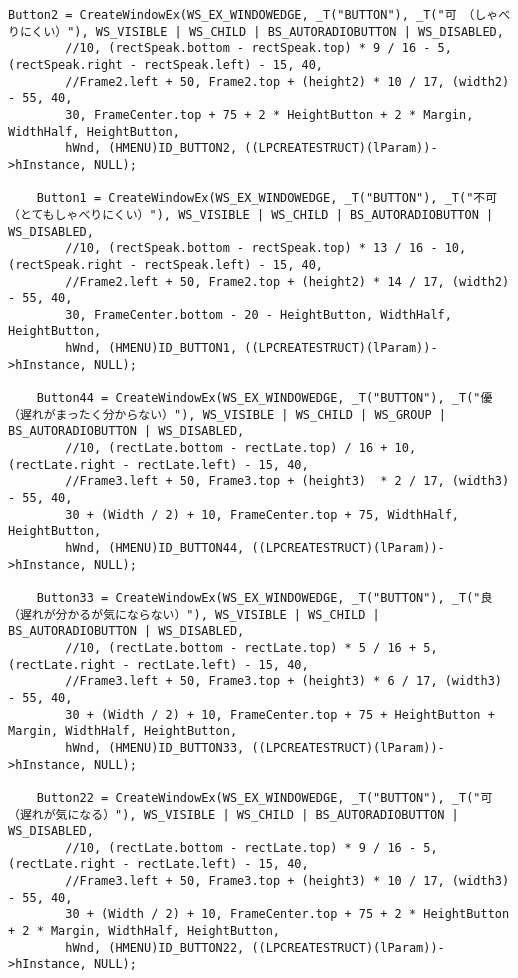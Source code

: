 \begin{lstlisting}[caption=window.cpp]
	Button2 = CreateWindowEx(WS_EX_WINDOWEDGE, _T("BUTTON"), _T("可　（しゃべりにくい）"), WS_VISIBLE | WS_CHILD | BS_AUTORADIOBUTTON | WS_DISABLED,
		//10, (rectSpeak.bottom - rectSpeak.top) * 9 / 16 - 5, (rectSpeak.right - rectSpeak.left) - 15, 40,
		//Frame2.left + 50, Frame2.top + (height2) * 10 / 17, (width2) - 55, 40,
		30, FrameCenter.top + 75 + 2 * HeightButton + 2 * Margin, WidthHalf, HeightButton,
		hWnd, (HMENU)ID_BUTTON2, ((LPCREATESTRUCT)(lParam))->hInstance, NULL);

	Button1 = CreateWindowEx(WS_EX_WINDOWEDGE, _T("BUTTON"), _T("不可（とてもしゃべりにくい）"), WS_VISIBLE | WS_CHILD | BS_AUTORADIOBUTTON | WS_DISABLED,
		//10, (rectSpeak.bottom - rectSpeak.top) * 13 / 16 - 10, (rectSpeak.right - rectSpeak.left) - 15, 40,
		//Frame2.left + 50, Frame2.top + (height2) * 14 / 17, (width2) - 55, 40,
		30, FrameCenter.bottom - 20 - HeightButton, WidthHalf, HeightButton,
		hWnd, (HMENU)ID_BUTTON1, ((LPCREATESTRUCT)(lParam))->hInstance, NULL);

	Button44 = CreateWindowEx(WS_EX_WINDOWEDGE, _T("BUTTON"), _T("優　（遅れがまったく分からない）"), WS_VISIBLE | WS_CHILD | WS_GROUP | BS_AUTORADIOBUTTON | WS_DISABLED,
		//10, (rectLate.bottom - rectLate.top) / 16 + 10, (rectLate.right - rectLate.left) - 15, 40,
		//Frame3.left + 50, Frame3.top + (height3)  * 2 / 17, (width3) - 55, 40,
		30 + (Width / 2) + 10, FrameCenter.top + 75, WidthHalf, HeightButton,
		hWnd, (HMENU)ID_BUTTON44, ((LPCREATESTRUCT)(lParam))->hInstance, NULL);

	Button33 = CreateWindowEx(WS_EX_WINDOWEDGE, _T("BUTTON"), _T("良　（遅れが分かるが気にならない）"), WS_VISIBLE | WS_CHILD | BS_AUTORADIOBUTTON | WS_DISABLED,
		//10, (rectLate.bottom - rectLate.top) * 5 / 16 + 5, (rectLate.right - rectLate.left) - 15, 40,
		//Frame3.left + 50, Frame3.top + (height3) * 6 / 17, (width3) - 55, 40,
		30 + (Width / 2) + 10, FrameCenter.top + 75 + HeightButton + Margin, WidthHalf, HeightButton,
		hWnd, (HMENU)ID_BUTTON33, ((LPCREATESTRUCT)(lParam))->hInstance, NULL);

	Button22 = CreateWindowEx(WS_EX_WINDOWEDGE, _T("BUTTON"), _T("可　（遅れが気になる）"), WS_VISIBLE | WS_CHILD | BS_AUTORADIOBUTTON | WS_DISABLED,
		//10, (rectLate.bottom - rectLate.top) * 9 / 16 - 5, (rectLate.right - rectLate.left) - 15, 40,
		//Frame3.left + 50, Frame3.top + (height3) * 10 / 17, (width3) - 55, 40,
		30 + (Width / 2) + 10, FrameCenter.top + 75 + 2 * HeightButton + 2 * Margin, WidthHalf, HeightButton,
		hWnd, (HMENU)ID_BUTTON22, ((LPCREATESTRUCT)(lParam))->hInstance, NULL);


\end{lstlisting}
